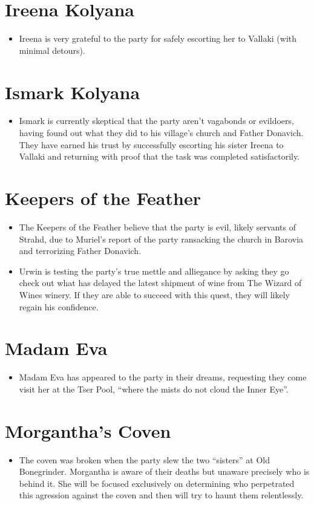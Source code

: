 \documentclass[a4paper,11pt]{article}
\begin{document}
\section{Ireena Kolyana}
\begin{itemize}
  \item Ireena is very grateful to the party for safely escorting her to Vallaki (with minimal detours).
\end{itemize}

\section{Ismark Kolyana}
\begin{itemize}
  \item Ismark is currently skeptical that the party aren't vagabonds or evildoers, having found out what they did
  to his village's church and Father Donavich. They have earned his trust by successfully escorting his sister 
  Ireena to Vallaki and returning with proof that the task was completed satisfactorily.
\end{itemize}

\section{Keepers of the Feather}
\begin{itemize}
  \item The Keepers of the Feather believe that the party is evil, likely servants of Strahd, due to Muriel's 
  report of the party ransacking the church in Barovia and terrorizing Father Donavich.
  \item Urwin is testing the party's true mettle and alliegance by asking they go check out what has delayed the
  latest shipment of wine from The Wizard of Wines winery. If they are able to succeed with this quest, they
  will likely regain his confidence.
\end{itemize}

\section{Madam Eva}
\begin{itemize}
  \item Madam Eva has appeared to the party in their dreams, requesting they come visit her at the Tser Pool, 
  ``where the mists do not cloud the Inner Eye''.
\end{itemize}

\section{Morgantha's Coven}
\begin{itemize}
  \item The coven was broken when the party slew the two ``sisters'' at Old Bonegrinder. Morgantha is aware of 
  their deaths but unaware precisely who is behind it. She will be focused exclusively on determining who 
  perpetrated this agression against the coven and then will try to haunt them relentlessly.
\end{itemize}
\end{document}
